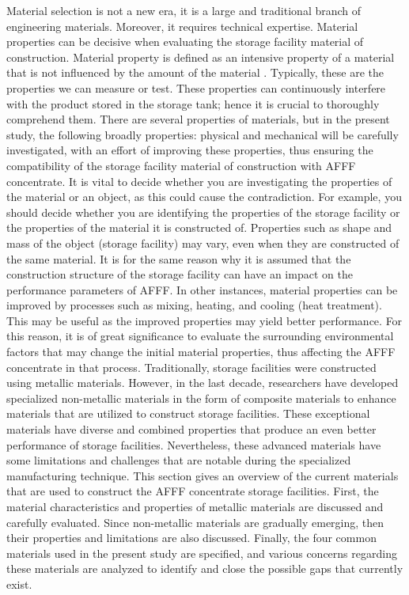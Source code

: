 \documentclass[12pt]{report}
\begin{document}
Material selection is not a new era, it is a large and traditional branch of engineering materials. Moreover, it requires technical expertise. Material properties can be decisive when evaluating the storage facility material of construction. Material property is defined as an intensive property of a material that is not influenced by the amount of the material \cite{mcarthur2004engineering}. Typically, these are the properties we can measure or test. These properties can continuously interfere with the product stored in the storage tank; hence it is crucial to thoroughly comprehend them. There are several properties of materials, but in the present study, the following broadly properties: physical and mechanical will be carefully investigated, with an effort of improving these properties, thus ensuring the compatibility of the storage facility material of construction with AFFF concentrate.
It is vital to decide whether you are investigating the properties of the material or an object, as this could cause the contradiction. For example, you should decide whether you are identifying the properties of the storage facility or the properties of the material it is constructed of. Properties such as shape and mass of the object (storage facility) may vary, even when they are constructed of the same material. It is for the same reason why it is assumed that the construction structure of the storage facility can have an impact on the performance parameters of AFFF.  In other instances, material properties can be improved by processes such as mixing, heating, and cooling (heat treatment). This may be useful as the improved properties may yield better performance. For this reason, it is of great significance to evaluate the surrounding environmental factors that may change the initial material properties, thus affecting the AFFF concentrate in that process.
Traditionally, storage facilities were constructed using metallic materials. However, in the last decade, researchers have developed specialized non-metallic materials in the form of composite materials to enhance materials that are utilized to construct storage facilities. These exceptional materials have diverse and combined properties that produce an even better performance of storage facilities. Nevertheless, these advanced materials have some limitations and challenges that are notable during the specialized manufacturing technique. 
This section gives an overview of the current materials that are used to construct the AFFF concentrate storage facilities. First, the material characteristics and properties of metallic materials are discussed and carefully evaluated. Since non-metallic materials are gradually emerging, then their properties and limitations are also discussed. Finally, the four common materials used in the present study are specified, and various concerns regarding these materials are analyzed to identify and close the possible gaps that currently exist.   
\end{document}

